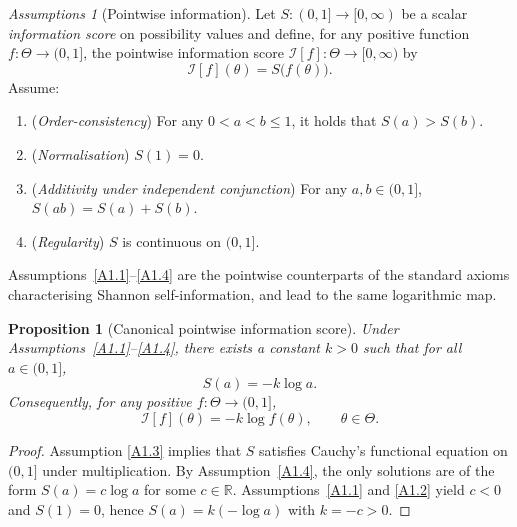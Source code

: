 \documentclass[accepted]{uai2026} %
\newtheorem{proposition}{Proposition}
\theoremstyle{remark}
\newtheorem*{assumptions*}{Assumptions}
\begin{document}
\begin{assumptions*}[Pointwise information]
Let $S:(0,1]\to[0,\infty)$ be a scalar \emph{information score} on possibility values and define, for any positive function $f:\Theta\to(0,1]$, the pointwise information score
$\mathcal{I}[f]:\Theta\to[0,\infty)$ by
\[
\mathcal{I}[f](\theta) = S\bigl(f(\theta)\bigr).
\]
Assume:
\begin{enumerate}[label=A1.\arabic*,leftmargin=25pt]
\item \label{A1.1} (\emph{Order-consistency}) For any $0 < a < b \leq 1$, it holds that $S(a) > S(b)$.
\item \label{A1.2} (\emph{Normalisation}) $S(1)=0$.
\item \label{A1.3} (\emph{Additivity under independent conjunction}) For any $a,b\in(0,1]$, $S(ab)=S(a)+S(b)$.
\item \label{A1.4} (\emph{Regularity}) $S$ is continuous on $(0,1]$.
\end{enumerate}
\end{assumptions*}

Assumptions~\ref{A1.1}--\ref{A1.4} are the pointwise counterparts of the standard axioms characterising Shannon self-information, and lead to the same logarithmic map.

\begin{proposition}[Canonical pointwise information score]
\label{prop:canonical_pointwise_information}
Under Assumptions~\ref{A1.1}--\ref{A1.4}, there exists a constant $k>0$ such that for all $a\in(0,1]$,
\[
S(a) = - k \log a.
\]
Consequently, for any positive $f:\Theta\to(0,1]$,
\[
\mathcal{I}[f](\theta) = - k \log f(\theta), \qquad \theta\in\Theta.
\]
\end{proposition}

\begin{proof}
Assumption \ref{A1.3} implies that $S$ satisfies Cauchy's functional equation on $(0,1]$ under multiplication. By Assumption~\ref{A1.4}, the only solutions are of the form $S(a)=c\log a$ for some $c\in\mathbb{R}$. Assumptions~\ref{A1.1} and \ref{A1.2} yield $c<0$ and $S(1)=0$, hence $S(a)=k(-\log a)$ with $k=-c>0$.
\end{proof}
\end{document}

